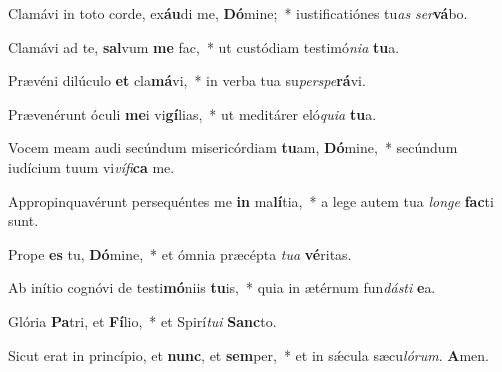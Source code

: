 \item Clamávi in toto corde, ex\textbf{áu}di me, \textbf{Dó}mine;~* iustificatiónes tu\textit{as} \textit{ser}\textbf{vá}bo.

\item Clamávi ad te, \textbf{sal}vum \textbf{me} fac,~* ut custódiam testimó\textit{ni}\textit{a} \textbf{tu}a.

\item Prævéni dilúculo \textbf{et} cla\textbf{má}vi,~* in verba tua su\textit{per}\textit{spe}\textbf{rá}vi.

\item Prævenérunt óculi \textbf{me}i vi\textbf{gí}lias,~* ut meditárer eló\textit{qui}\textit{a} \textbf{tu}a.

\item Vocem meam audi secúndum misericórdiam \textbf{tu}am, \textbf{Dó}mine,~* secúndum iudícium tuum vi\textit{ví}\textit{fi}\textbf{ca} me.

\item Appropinquavérunt persequéntes me \textbf{in} ma\textbf{lí}tia,~* a lege autem tua \textit{lon}\textit{ge} \textbf{fac}ti sunt.

\item Prope \textbf{es} tu, \textbf{Dó}mine,~* et ómnia præcépta \textit{tu}\textit{a} \textbf{vé}ritas.

\item Ab inítio cognóvi de testi\textbf{mó}niis \textbf{tu}is,~* quia in ætérnum fun\textit{dás}\textit{ti} \textbf{e}a.

\item Glória \textbf{Pa}tri, et \textbf{Fí}lio,~* et Spirí\textit{tu}\textit{i} \textbf{Sanc}to.

\item Sicut erat in princípio, et \textbf{nunc}, et \textbf{sem}per,~* et in sǽcula sæcu\textit{ló}\textit{rum}. \textbf{A}men.